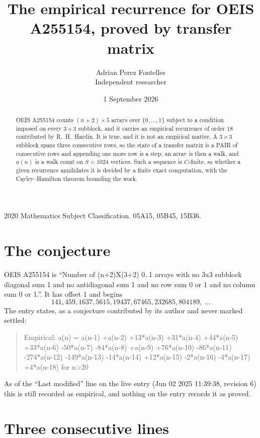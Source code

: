 \documentclass[11pt,a4paper]{article}
\title{The empirical recurrence for OEIS A255154, proved by transfer matrix}
\author{Adrian Perez Fontelles\\ \small Independent researcher}
\date{1 September 2026}
\theoremstyle{plain}
\theoremstyle{definition}
\begin{document}
\maketitle

\begin{abstract}
OEIS A255154 counts $(n+2)\times5$ arrays over $\{0,\dots,1\}$ subject to a condition imposed on
every $3\times3$ subblock, and it carries an empirical recurrence of order $18$
contributed by R.~H.~Hardin. It is true, and it is not an empirical matter. A $3\times3$
subblock spans three consecutive rows, so the state of a transfer matrix is a PAIR of
consecutive rows and appending one more row is a step; an array is then a walk, and
$a(n)$ is a walk count on $S=1024$ vertices. Such a sequence is $C$-finite, so whether a given
recurrence annihilates it is decided by a finite exact computation, with the Cayley--Hamilton
theorem bounding the work.
\end{abstract}

\noindent\small 2020 Mathematics Subject Classification. 05A15, 05B45, 15B36.\normalsize

\section{The conjecture}

OEIS A255154 is ``Number of (n+2)X(3+2) 0..1 arrays with no 3x3 subblock diagonal sum 1 and no antidiagonal sum 1 and no row sum 0 or 1 and no column sum 0 or 1.''. It has offset $1$ and begins
\[
141, 459, 1637, 5615, 19437, 67465, 232685, 804189,\ \dots
\]
The entry states, as a conjecture contributed by its author and never marked settled:
\begin{quote}
Empirical: a(n) = a(n-1) +a(n-2) +13*a(n-3) +31*a(n-4) +44*a(n-5) +33*a(n-6) -50*a(n-7) -84*a(n-8) +a(n-9) +76*a(n-10) -86*a(n-11) -274*a(n-12) -149*a(n-13) -14*a(n-14) +12*a(n-15) -2*a(n-16) -4*a(n-17) +4*a(n-18) for n>20
\end{quote}
As of the ``Last modified'' line on the live entry (Jun 02 2025 11:39:38, revision 6) this is still
recorded as empirical, and nothing on the entry records it as proved.

\section{Three consecutive lines}
\end{document}
